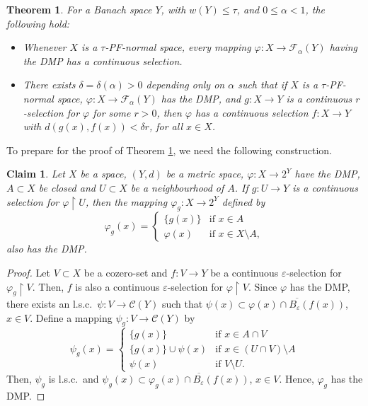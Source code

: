 \documentclass[12pt,a4paper,fleqn,leqno]{amsart}
\theoremstyle{plain}
\newtheorem{theorem}{Theorem}[section]
\newtheorem{claim}{Claim}
\theoremstyle{definition}
\numberwithin{equation}{section}
\begin{document}
\begin{theorem}
\label{pf-thm}For a Banach space $Y$, with $w(Y)\leq \tau$, and $0\leq\alpha<1$, the following hold\textup{:}
\begin{itemize}
\item[(a)] Whenever $X$ is a $\tau$-PF-normal space, every mapping $\varphi:X\to\mathscr{F}_{\alpha}(Y)$ having the DMP has a continuous selection.
\item[(b)] There exists $\delta=\delta(\alpha)>0$ depending only on $\alpha$ such that if $X$ is a $\tau$-PF-normal space, $\varphi:X\to\mathscr{F}_{\alpha}(Y)$ has the DMP, and $g:X\to Y$ is a continuous $r$-selection for $\varphi$ for some $r>0$, then $\varphi$ has a continuous selection $f:X\to Y$ with $d(g(x),f(x))<\delta r$, for all $x\in X$.
\end{itemize}
\end{theorem}

To prepare for the proof of Theorem \ref{pf-thm}, we need the following construction.

\begin{claim}
\label{claim}
Let $X$ be a space, $(Y,d)$ be a metric space, $\varphi:X\to 2^Y$ have the DMP, $A\subset X$ be closed and $U\subset X$ be a neighbourhood of $A$. If $g:U\to Y$ is a continuous selection for $\varphi\operatorname{\upharpoonright} U$, then the mapping $\varphi_g:X\to 2^Y$ defined by
\begin{displaymath}
\varphi_{g}(x)=\left\{\begin{array}{ll}
      \{g(x)\} & \textrm{if $x\in A$}\\
      \varphi(x) & \textrm{if $x\in X\setminus A,$}
      \end{array}\right.
\end{displaymath}
also has the DMP.
\end{claim}

\begin{proof}
Let $V\subset X$ be a cozero-set and $f:V\to Y$ be a continuous $\varepsilon$-selection for $\varphi_g\operatorname{\upharpoonright} V$. Then, $f$ is also a continuous $\varepsilon$-selection for $\varphi\operatorname{\upharpoonright} V$. Since $\varphi$ has the DMP, there exists an l.s.c.\ $\psi:V\to\mathscr{C}(Y)$ such that $\psi(x)\subset\overline{\varphi(x)\cap B_{\varepsilon}(f(x))}$, $x\in V$. Define a mapping $\psi_g:V\to\mathscr{C}(Y)$ by
\begin{displaymath}
\psi_{g}(x)=\left\{\begin{array}{lll}
      \{g(x)\} & \textrm{if $x\in A\cap V$}\\
      \{g(x)\}\cup\psi(x) & \textrm{if $x\in (U\cap V)\setminus A$}\\
      \psi(x) & \textrm{if $V\setminus U$}.
      \end{array}\right.
\end{displaymath}
Then, $\psi_g$ is l.s.c.\ and $\psi_g(x)\subset\overline{\varphi_g(x)\cap B_{\varepsilon}(f(x))}$, $x\in V$. Hence, $\varphi_g$ has the DMP.
\end{proof}
\end{document}
